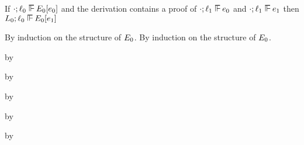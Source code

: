 \begin{lemma}\label{H-label-replacement}
  If\/ $\snil; \sowner_0 \sWSOP \ctx_0[\sexpr_0]$
  and the derivation contains a proof of\/ $\snil; \sowner_1 \sWSOP \sexpr_0$
  and\/ $\snil; \sowner_1 \sWSOP \sexpr_1$
  then\/ $\sownerenv_0; \sowner_0 \sWSOP \ctx_0[\sexpr_1]$
\end{lemma}{
\newcommand{\shortproof}{By induction on the structure of $\ctx_0$.}
\begin{lamportproof*}
  \shortproof
\mainproof
  \shortproof

    \begin{pfproof}
      \qedstep
    \end{pfproof}

    \begin{pfproof}
      \qedstep
        \begin{pfproof}
          by \pfih
        \end{pfproof}
    \end{pfproof}

    \begin{pfproof}
      \qedstep
        \begin{pfproof}
          by \pfih
        \end{pfproof}
    \end{pfproof}

    \begin{pfproof}
      \qedstep
        \begin{pfproof}
          by \pfih
        \end{pfproof}
    \end{pfproof}

    \begin{pfproof}
      \qedstep
        \begin{pfproof}
          by \pfih
        \end{pfproof}
    \end{pfproof}

    \begin{pfproof}
      \qedstep
        \begin{pfproof}
          by \pfih
        \end{pfproof}
    \end{pfproof}


\end{lamportproof*}}
